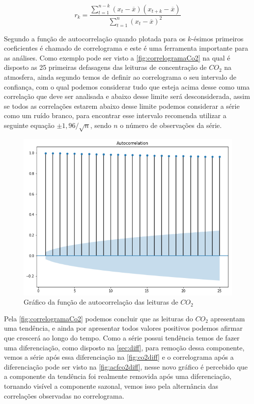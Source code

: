 \documentclass[
    12pt,
    oneside,
    a4paper,
    english,
    brazil
]{abntex2}
\begin{document}
\begin{equation}
    \label{eq:autocorrelacao}
    r_k = \frac{\sum_{t=1}^{n-k}{(x_t - \overline{x})(x_{t+k} -
    \overline{x})}}{\sum_{t=1}^{n}{(x_t - \overline{x})^2}}
\end{equation}

Segundo   a  função  de autocorrelação  quando plotada  para
os  $k$-ésimos  primeiros  coeficientes  é   chamado  de  correlograma  e  este
é  uma  ferramenta   importante  para  as  análises.  Como   exemplo  pode  ser
visto  a  \autoref{fig:correlogramaCo2} na  qual  é  disposto as  25  primeiras
defasagens das leituras  de concentração de $CO_2$ na  atmosfera, ainda segundo
  temos  de  definir  ao correlograma  o  seu  intervalo  de
confiança, com o  qual podemos considerar tudo que esteja  acima desse como uma
correlação que  deve ser analisada  e abaixo desse limite  será desconsiderada,
assim se todos as correlações estarem  abaixo desse limite podemos considerar a
série como um  ruído branco, para encontrar  esse intervalo 
recomenda utilizar a seguinte equação  $\pm{}1,96/\sqrt{n}$, sendo $n$ o número
de observações da série.

\begin{figure}
    \centering
    \caption{Gráfico da função de autocorrelação das leituras de
        $CO_2$}\label{fig:correlogramaCo2}
    \includegraphics[width=.6\linewidth]{images/acf_co2.png}
\end{figure}

Pela \autoref{fig:correlogramaCo2}  podemos concluir que as  leituras do $CO_2$
apresentam  uma  tendência, e  ainda  por  apresentar todos  valores  positivos
podemos afirmar que  crescerá ao longo do tempo. Como  a série possui tendência
temos  de  fazer  uma   diferenciação,  como  disposto  na  \autoref{sec:diff},
para  remoção  dessa componente,  vemos  a  série  após essa  diferenciação  na
\autoref{fig:co2diff} e o  correlograma após a diferenciação pode  ser visto na
\autoref{fig:acfco2diff}, nesse  novo gráfico é  percebido que a  componente da
tendência foi  realmente removida  após uma  diferenciação, tornando  visível a
componente sazonal, vemos  isso pela alternância das  correlações observadas no
correlograma.
\end{document}
